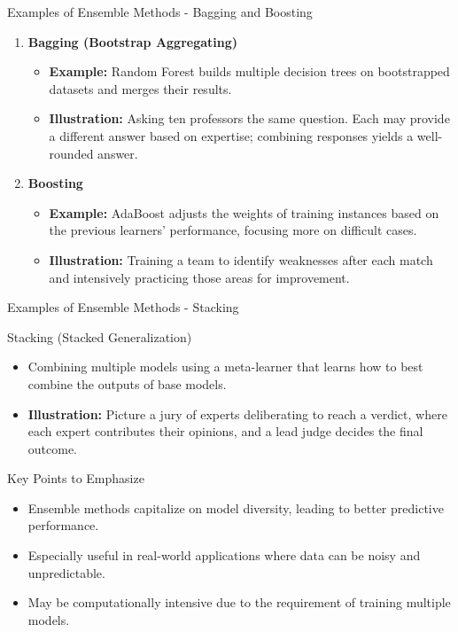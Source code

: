 \documentclass[aspectratio=169]{beamer}
\begin{document}
\begin{frame}[fragile]{Examples of Ensemble Methods - Bagging and Boosting}
    \begin{enumerate}
        \item \textbf{Bagging (Bootstrap Aggregating)}
        \begin{itemize}
            \item \textbf{Example:} Random Forest builds multiple decision trees on bootstrapped datasets and merges their results.
            \item \textbf{Illustration:} Asking ten professors the same question. Each may provide a different answer based on expertise; combining responses yields a well-rounded answer.
        \end{itemize}

        \item \textbf{Boosting}
        \begin{itemize}
            \item \textbf{Example:} AdaBoost adjusts the weights of training instances based on the previous learners' performance, focusing more on difficult cases.
            \item \textbf{Illustration:} Training a team to identify weaknesses after each match and intensively practicing those areas for improvement.
        \end{itemize}
    \end{enumerate}
\end{frame}

\begin{frame}[fragile]{Examples of Ensemble Methods - Stacking}
    \begin{block}{Stacking (Stacked Generalization)}
        \begin{itemize}
            \item Combining multiple models using a meta-learner that learns how to best combine the outputs of base models.
            \item \textbf{Illustration:} Picture a jury of experts deliberating to reach a verdict, where each expert contributes their opinions, and a lead judge decides the final outcome.
        \end{itemize}
    \end{block}
\end{frame}

\begin{frame}[fragile]{Key Points to Emphasize}
    \begin{itemize}
        \item Ensemble methods capitalize on model diversity, leading to better predictive performance.
        \item Especially useful in real-world applications where data can be noisy and unpredictable.
        \item May be computationally intensive due to the requirement of training multiple models.
    \end{itemize}
\end{frame}
\end{document}
